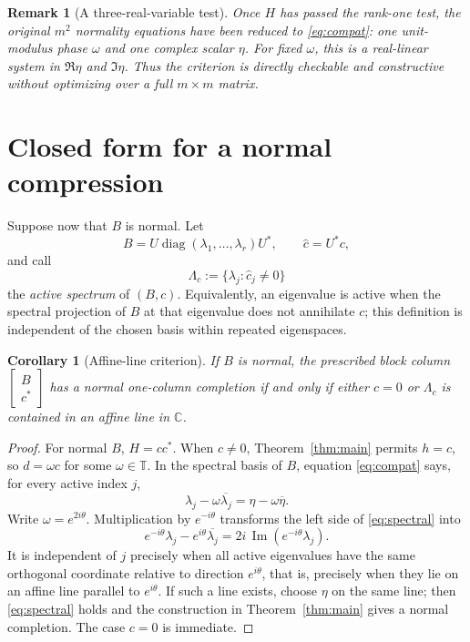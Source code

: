 \documentclass[11pt]{article}
\newtheorem{corollary}[theorem]{Corollary}
\newtheorem{remark}[theorem]{Remark}
\newcommand{\C}{\mathbb C}
\newcommand{\T}{\mathbb T}
\begin{document}
\begin{remark}[A three-real-variable test]
Once $H$ has passed the rank-one test, the original $m^2$ normality equations
have been reduced to \eqref{eq:compat}: one unit-modulus phase $\omega$ and
one complex scalar $\eta$.  For fixed $\omega$, this is a real-linear system
in $\Re\eta$ and $\Im\eta$.  Thus the criterion is directly checkable and
constructive without optimizing over a full $m\times m$ matrix.
\end{remark}

\section{Closed form for a normal compression}

Suppose now that $B$ is normal.  Let
\[
 B=U\operatorname{diag}(\lambda_1,\ldots,\lambda_r)U^*,
 \qquad \widehat c=U^*c,
\]
and call
\[
 \Lambda_c:=\{\lambda_j:\widehat c_j\ne0\}
\]
the \emph{active spectrum} of $(B,c)$.  Equivalently, an eigenvalue is active
when the spectral projection of $B$ at that eigenvalue does not annihilate
$c$; this definition is independent of the chosen basis within repeated
eigenspaces.

\begin{corollary}[Affine-line criterion]\label{cor:line}
If $B$ is normal, the prescribed block column
$\left[\begin{smallmatrix}B\\c^*\end{smallmatrix}\right]$ has a normal
one-column completion if and only if either $c=0$ or $\Lambda_c$ is contained
in an affine line in $\C$.
\end{corollary}

\begin{proof}
For normal $B$, $H=cc^*$.  When $c\ne0$, Theorem~\ref{thm:main} permits
$h=c$, so $d=\omega c$ for some $\omega\in\T$.  In the spectral basis of
$B$, equation \eqref{eq:compat} says, for every active index $j$,
\begin{equation}\label{eq:spectral}
 \lambda_j-\omega\overline{\lambda_j}
 =\eta-\omega\overline\eta.
\end{equation}
Write $\omega=e^{2i\theta}$.  Multiplication by $e^{-i\theta}$ transforms
the left side of \eqref{eq:spectral} into
\[
 e^{-i\theta}\lambda_j-e^{i\theta}\overline{\lambda_j}
 =2i\,\operatorname{Im}(e^{-i\theta}\lambda_j).
\]
It is independent of $j$ precisely when all active eigenvalues have the same
orthogonal coordinate relative to direction $e^{i\theta}$, that is, precisely
when they lie on an affine line parallel to $e^{i\theta}$.  If such a line
exists, choose $\eta$ on the same line; then \eqref{eq:spectral} holds and the
construction in Theorem~\ref{thm:main} gives a normal completion.  The case
$c=0$ is immediate.
\end{proof}
\end{document}

